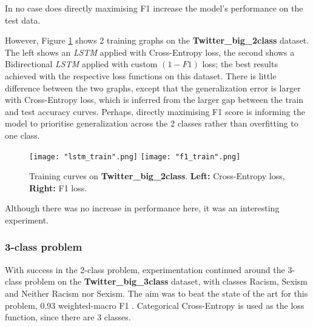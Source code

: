 \documentclass[12pt,a4paper]{article}
\begin{document}
In no case does directly maximising F1 increase the model's performance on the test data. 

However, Figure \ref{train:train2} shows 2 training graphs on the \textbf{Twitter\_big\_2class} dataset. The left shows an \textit{LSTM} applied with Cross-Entropy loss, the second shows a Bidirectional \textit{LSTM} applied with custom $(1-F1)$ loss; the best results achieved with the respective loss functions on this dataset. There is little difference between the two graphs, except that the generalization error is larger with Cross-Entropy loss, which is inferred from the larger gap between the train and test accuracy curves. Perhaps, directly maximising F1 score is informing the model to prioritise generalization across the 2 classes rather than overfitting to one class.

\begin{figure}[H]
	\centering
	\texttt{[image: "lstm\_train".png]} \hfill
	\texttt{[image: "f1\_train".png]}\hfill
	
	\caption{Training curves on \textbf{Twitter\_big\_2class}. \textbf{Left:} Cross-Entropy loss, \textbf{Right:} F1 loss.}
	\label{train:train2}
\end{figure}

Although there was no increase in performance here, it was an interesting experiment.

\subsubsection{3-class problem}

With success in the 2-class problem, experimentation continued around the 3-class problem on the \textbf{Twitter\_big\_3class} dataset, with classes Racism, Sexism and Neither Racism nor Sexism. The aim was to beat the state of the art for this problem, 0.93 weighted-macro F1 \cite{Badjatiya}. Categorical Cross-Entropy is used as the loss function, since there are 3 classes.
\end{document}
